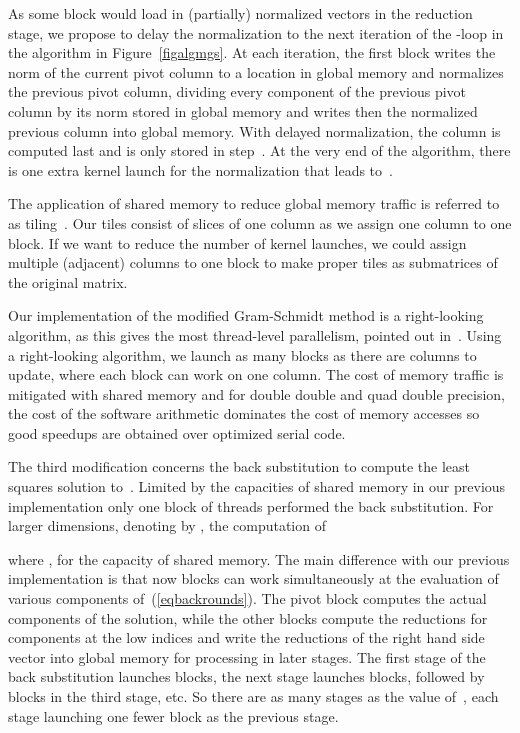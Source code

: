\documentclass{article}
\begin{document}
As some block would load in (partially) normalized vectors in the
reduction stage, we propose to delay the normalization to the next
iteration of the -loop in the algorithm in Figure~\ref{figalgmgs}.  
At each iteration, the first block writes the norm of the current 
pivot column to a location in global memory and normalizes the previous
pivot column, dividing every component of the previous pivot column 
by its norm stored in global memory and writes then the normalized 
previous column into global memory. 
With delayed normalization, the column  is computed last
and is only stored in step~.
At the very end of the algorithm, there is one extra kernel launch
for the normalization that leads to~.

The application of shared memory to reduce global memory traffic
is referred to as tiling~\cite[pages 108-109]{KH13}.
Our tiles consist of slices of one column as we assign one column
to one block.  If we want to reduce the number of kernel launches,
we could assign multiple (adjacent) columns to one block
to make proper tiles as submatrices of the original matrix.

Our implementation of the modified Gram-Schmidt method is a
right-looking algorithm, as this gives the most thread-level
parallelism, pointed out in~\cite{VD08}.
Using a right-looking algorithm, we launch as many blocks as
there are columns to update, where each block can work on one column.
The cost of memory traffic is mitigated with shared memory
and for double double and quad double precision, the cost of
the software arithmetic dominates the cost of memory accesses
so good speedups are obtained over optimized serial code.

The third modification concerns the back substitution 
to compute the least squares solution to~.
Limited by the capacities of shared memory in our previous implementation
only one block of threads performed the back substitution.
For larger dimensions, denoting  by , the computation of

where , for the capacity  of shared memory.
The main difference with our previous implementation is that now 
blocks can work simultaneously at the evaluation of various components
of~(\ref{eqbackrounds}).  The pivot block computes the actual components
of the solution, while the other blocks compute the reductions for
components at the low indices and write the reductions of the right
hand side vector into global memory for processing in later stages.
The first stage of the back substitution launches  blocks,
the next stage launches  blocks, followed by  blocks
in the third stage, etc.  So there are as many stages as the value of~,
each stage launching one fewer block as the previous stage.
\end{document}
